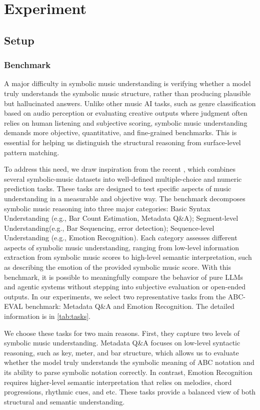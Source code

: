 \documentclass[sigconf]{acmart}
\begin{document}
\section{Experiment}
\subsection{Setup}
\subsubsection{Benchmark}
A major difficulty in symbolic music understanding is verifying whether a model truly understands the symbolic music structure, rather than producing plausible but hallucinated answers. Unlike other music AI tasks, such as genre classification based on audio perception or evaluating creative outputs where judgment often relies on human listening and subjective scoring, symbolic music understanding demands more objective, quantitative, and fine-grained benchmarks. This is essential for helping us distinguish the structural reasoning from surface-level pattern matching. 

To address this need, we draw inspiration from the recent \citet{zhaoABCEvalBenchmarkingLarge2025}, which combines several symbolic-music datasets into well-defined multiple-choice and numeric prediction tasks. These tasks are designed to test specific aspects of music understanding in a measurable and objective way. The benchmark decomposes symbolic music reasoning into three major categories: Basic Syntax Understanding (e.g., Bar Count Estimation, Metadata Q\&A); Segment-level Understanding(e.g., Bar Sequencing, error detection); Sequence-level Understanding (e.g., Emotion Recognition). Each category assesses different aspects of symbolic music understanding, ranging from low-level information extraction from symbolic music scores to high-level semantic interpretation, such as describing the emotion of the provided symbolic music score. With this benchmark, it is possible to meaningfully compare the behavior of pure LLMs and agentic systems without stepping into subjective evaluation or open-ended outputs. In our experiments, we select two representative tasks from the ABC-EVAL benchmark: Metadata Q\&A and Emotion Recognition. The detailed information is in \autoref{tab:tasks}. 

We choose these tasks for two main reasons. First, they capture two levels of symbolic music understanding. Metadata Q\&A focuses on low-level syntactic reasoning, such as key, meter, and bar structure, which allows us to evaluate whether the model truly understands the symbolic meaning of ABC notation and its ability to parse symbolic notation correctly. In contrast, Emotion Recognition requires higher-level semantic interpretation that relies on melodies, chord progressions, rhythmic cues, and etc. These tasks provide a balanced view of both structural and semantic understanding. 
\end{document}
